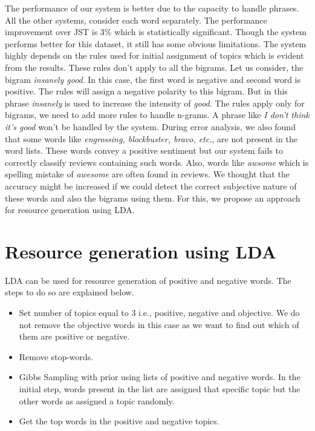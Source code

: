 \documentclass[11pt]{article}
\begin{document}
The performance of our system is better due to the capacity to handle phrases. All the other systems, consider each word
separately. The performance improvement over JST is 3\% which is statistically significant. Though the system performs
better for this dataset, it still has some obvious limitations. The system highly depends on the rules used for
initial assignment of topics which is evident from the results. These rules don't apply to all the bigrams. Let us
consider, the bigram \textit{insanely good}. In this case, the first word is negative and second word is positive. The rules
will assign a negative polarity to this bigram. But in this phrase \textit{insanely} is used to increase the intensity of 
\textit{good}. The rules apply only for bigrams, we need to add more rules to handle n-grams. A phrase like \textit{I don't
think it's good} won't be handled by the system. During error analysis, we also found that some words like \textit{engrossing,
blockbuster, bravo, etc.}, are not present in the word lists. These words convey a positive sentiment but our system fails
to correctly classify reviews containing such words. Also, words like \textit{awsome} which is spelling mistake of \textit{awesome}
are often found in reviews. We thought that the accuracy might be increased if we could detect the correct subjective
nature of these words and also the bigrams using them. For this, we propose an approach for resource generation using LDA.

\section{Resource generation using LDA}\label{resource}

LDA can be used for resource generation of positive and negative words. The steps to do so are explained below.

\begin{itemize}
 \itemsep0em
 \item Set number of topics equal to 3 i.e., positive, negative and objective. We do not remove the objective
 words in this case as we want to find out which of them are positive or negative.
 \item Remove stop-words.
 \item Gibbs Sampling with prior using lists of positive and negative words. In the initial step, words present 
 in the list are assigned that specific topic but the other words as assigned a topic randomly.
 \item Get the top words in the positive and negative topics.
\end{itemize}
\end{document}
